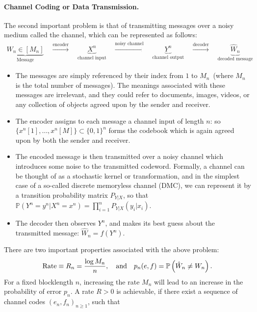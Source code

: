 \documentclass[12pt]{article}
\begin{document}
\paragraph{Channel Coding or Data Transmission.} The second important problem is that of transmitting messages over a noisy medium called the channel, which can be represented as follows: 
\begin{align}
\underbrace{W_n \in [M_n]}_{\text{Message}} \quad\stackrel{\text{encoder}}{\longrightarrow}\quad \underbrace{X^n}_{\text{channel input}} \quad\stackrel{\text{noisy channel}}{\longrightarrow} \quad \underbrace{Y^n}_{\text{channel output}} \quad \stackrel{\text{decoder}}{\longrightarrow} \quad \underbrace{\hat{W}_n}_{\text{decoded message}}
\end{align}
\begin{itemize}
\item The messages are simply referenced by their index from $1$ to $M_n$~(where $M_n$ is the total number of messages). The meanings associated with these messages are irrelevant, and they could refer to documents, images, videos, or any collection of objects agreed upon by the sender and receiver. 
\item The encoder assigns to each message a channel input of length $n$: so$\{ x^n[1], \ldots, x^n[M]\} \subset \{0,1\}^n$ forms the codebook which is again agreed upon by both the sender and receiver.  
\item The encoded message is then transmitted over a noisy channel which introduces some noise to the transmitted codeword. Formally, a channel can be thought of as a stochastic kernel or transformation, and in the simplest case of a so-called discrete memoryless channel (DMC), we can represent it by a transition probability matrix $P_{Y|X}$, so that $\mathbb{P}(Y^n = y^n|X^n = x^n) = \prod_{i=1}^n P_{Y|X}(y_i|x_i)$. 
\item The decoder then observes $Y^n$, and makes its best guess about the transmitted message: $\hat{W}_n = f(Y^n)$. 
\end{itemize}
There are two important properties associated with the above problem: 
\begin{align}
\mathrm{Rate} \equiv R_n = \frac{ \log M_n}{n}, \quad \text{and} \quad p_{n}(e,f) = \mathbb{P}\left( \hat{W}_n \neq W_n \right).  
\end{align}
For a fixed blocklength $n$, increasing the rate $M_n$ will lead to an increase in the probability of error $p_{n}$. A rate $R>0$ is achievable, if there exist a sequence of channel codes $(e_n, f_n)_{n \geq 1}$, such that 
\end{document}
